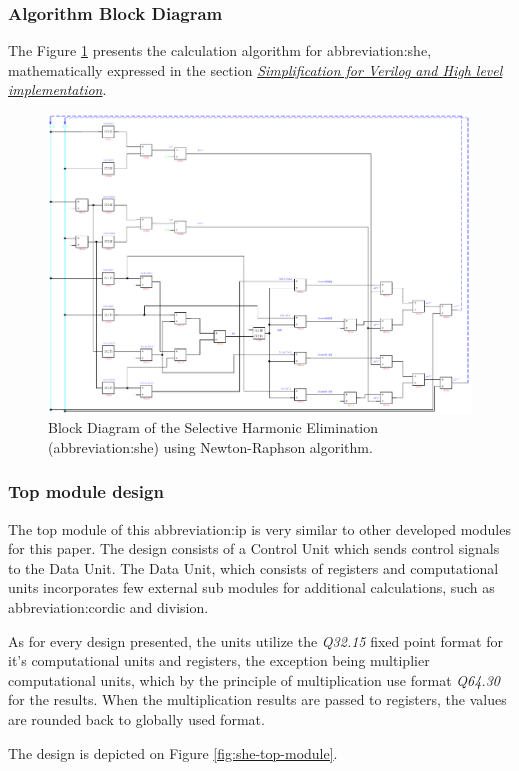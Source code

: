 \documentclass[a4paper, twoside, 11pt]{article}
\begin{document}
        \subsubsection{Algorithm Block Diagram}\label{subsubsec:algorithm-block-design}
            The Figure \ref{fig:she-overview} presents the calculation algorithm for \gls{abbreviation:she}, mathematically expressed in the section \hyperref[subsec:simplification-for-verilog-and-high-level-implementation]{\textit{Simplification for Verilog and High level implementation}}.
            \begin{figure}[htbp!]
                \centering
                \includegraphics[width=1\textwidth]{src/pdf/she-overview.pdf}
                \caption{Block Diagram of the Selective Harmonic Elimination (\gls{abbreviation:she}) using Newton-Raphson algorithm.}
                \label{fig:she-overview}
            \end{figure}

    \FloatBarrier
        \subsubsection{Top module design}
            The top module of this \gls{abbreviation:ip} is very similar to other developed modules for this paper. The design consists of a Control Unit which sends control signals to the Data Unit. The Data Unit, which consists of registers and computational units incorporates few external sub modules for additional calculations, such as \gls{abbreviation:cordic} and division.\par
            As for every design presented, the units utilize the \textit{Q32.15} fixed point format for it's computational units and registers, the exception being multiplier computational units, which by the principle of multiplication use format \textit{Q64.30} for the results. When the multiplication results are passed to registers, the values are rounded back to globally used format.\par
            The design is depicted on Figure \ref{fig:she-top-module}.
\end{document}
